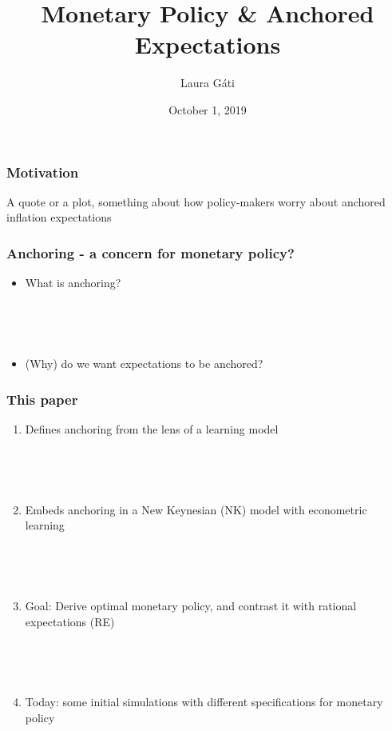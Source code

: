 \documentclass{beamer}
\author[]{Laura G\'ati}
\institute[]{Boston College}
\title[]{Monetary Policy \& Anchored Expectations}
\date[]{October 1, 2019}
\begin{document}
\begin{frame}

\maketitle


\end{frame}


\begin{frame}
	\frametitle{Motivation}

A quote or a plot, something about how policy-makers worry about anchored inflation expectations
\end{frame}

\begin{frame}
	\frametitle{Anchoring - a concern for monetary policy?}

\begin{itemize}
\item What is anchoring?

\

\

\item (Why) do we want expectations to be anchored?
\end{itemize}

\end{frame}

\begin{frame}
	\frametitle{This paper}
	
	\begin{enumerate}
	\item Defines anchoring from the lens of a learning model
	
	\
	
	\
	
	\item Embeds anchoring in a New Keynesian (NK) model with econometric learning
	
	\
	
	\
	
	\item Goal: Derive optimal monetary policy, and contrast it with rational expectations (RE) 
	
	\
	
	\
	
	\item Today: some initial simulations with different specifications for monetary policy
	\end{enumerate}


\end{frame}
\end{document}
